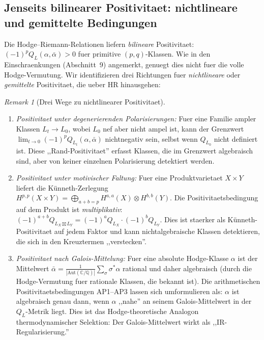 \documentclass[aps,prd,twocolumn,superscriptaddress,nofootinbib]{revtex4-2}
\theoremstyle{definition}
\theoremstyle{remark}
\newtheorem{remark}[theorem]{Remark}
\begin{document}
\subsection{Jenseits bilinearer Positivitaet: nichtlineare und gemittelte Bedingungen}
\label{sec:nonlinear-positivity}

Die Hodge--Riemann-Relationen liefern \emph{bilineare} Positivitaet: $(-1)^p Q_L(\alpha, \bar\alpha) > 0$ fuer primitive $(p,q)$-Klassen. Wie in den Einschraenkungen (Abschnitt~9) angemerkt, genuegt dies nicht fuer die volle Hodge-Vermutung. Wir identifizieren drei Richtungen fuer \emph{nichtlineare} oder \emph{gemittelte} Positivitaet, die ueber HR hinausgehen:

\begin{remark}[Drei Wege zu nichtlinearer Positivitaet]
\label{rem:nonlinear-positivity}
\begin{enumerate}
\item \emph{Positivitaet unter degenerierenden Polarisierungen:} Fuer eine Familie ampler Klassen $L_t \to L_0$, wobei $L_0$ nef aber nicht ampel ist, kann der Grenzwert $\lim_{t \to 0} (-1)^p Q_{L_t}(\alpha, \bar\alpha)$ nichtnegativ sein, selbst wenn $Q_{L_0}$ nicht definiert ist. Diese ,,Rand-Positivitaet'' erfasst Klassen, die im Grenzwert algebraisch sind, aber von keiner einzelnen Polarisierung detektiert werden.

\item \emph{Positivitaet unter motivischer Faltung:} Fuer eine Produktvarietaet $X \times Y$ liefert die K\"unneth-Zerlegung $H^{p,p}(X \times Y) = \bigoplus_{a+b=p} H^{a,a}(X) \otimes H^{b,b}(Y)$. Die Positivitaetsbedingung auf dem Produkt ist \emph{multiplikativ}: $(-1)^{a+b} Q_{L_X \boxtimes L_Y} = (-1)^a Q_{L_X} \cdot (-1)^b Q_{L_Y}$. Dies ist staerker als K\"unneth-Positivitaet auf jedem Faktor und kann nichtalgebraische Klassen detektieren, die sich in den Kreuztermen ,,verstecken''.

\item \emph{Positivitaet nach Galois-Mittelung:} Fuer eine absolute Hodge-Klasse $\alpha$ ist der Mittelwert $\bar\alpha = \frac{1}{|\mathrm{Aut}(\mathbb{C}/\mathbb{Q})|} \sum_{\sigma} \sigma^* \alpha$ rational und daher algebraisch (durch die Hodge-Vermutung fuer rationale Klassen, die bekannt ist). Die arithmetischen Positivitaetsbedingungen AP1--AP3 lassen sich umformulieren als: $\alpha$ ist algebraisch genau dann, wenn $\alpha$ ,,nahe'' an seinem Galois-Mittelwert in der $Q_L$-Metrik liegt. Dies ist das Hodge-theoretische Analogon thermodynamischer Selektion: Der Galois-Mittelwert wirkt als ,,IR-Regularisierung.''
\end{enumerate}
\end{remark}
\end{document}
